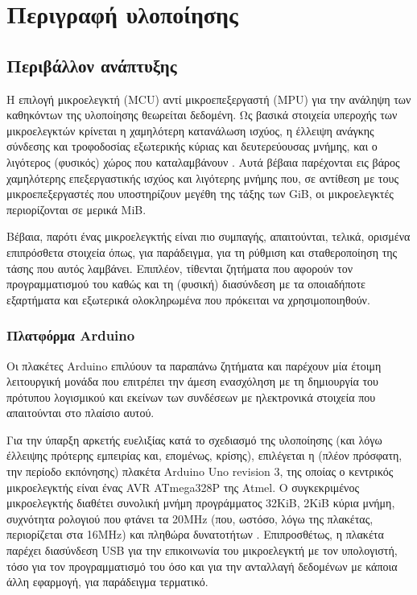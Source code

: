 \chapter{Περιγραφή υλοποίησης}


\section{Περιβάλλον ανάπτυξης}

Η επιλογή μικροελεγκτή (MCU) αντί μικροεπεξεργαστή (MPU) για την ανάληψη των
καθηκόντων της υλοποίησης θεωρείται δεδομένη.
Ως βασικά στοιχεία υπεροχής των μικροελεγκτών κρίνεται η χαμηλότερη κατανάλωση
ισχύος, η έλλειψη ανάγκης σύνδεσης και τροφοδοσίας εξωτερικής κύριας και
δευτερεύουσας μνήμης, και ο λιγότερος (φυσικός) χώρος που καταλαμβάνουν
\parencite[1--2]{atmel13:mpu-mcu}. Αυτά βέβαια παρέχονται εις βάρος χαμηλότερης
επεξεργαστικής ισχύος και λιγότερης μνήμης που, σε αντίθεση με τους
μικροεπεξεργαστές που υποστηρίζουν μεγέθη της τάξης των GiB, οι μικροελεγκτές
περιορίζονται σε μερικά MiB.

Βέβαια, παρότι ένας μικροελεγκτής είναι πιο συμπαγής, απαιτούνται, τελικά,
ορισμένα επιπρόσθετα στοιχεία όπως, για παράδειγμα, για τη ρύθμιση και
σταθεροποίηση της τάσης που αυτός λαμβάνει. Επιπλέον, τίθενται ζητήματα που
αφορούν τον προγραμματισμού του καθώς και τη (φυσική) διασύνδεση με τα
οποιαδήποτε εξαρτήματα και εξωτερικά ολοκληρωμένα που πρόκειται να
χρησιμοποιηθούν.


\subsection{Πλατφόρμα Arduino}
\label{subsec:arduino}

Οι πλακέτες Arduino επιλύουν τα παραπάνω ζητήματα και παρέχουν μία έτοιμη
λειτουργική μονάδα που επιτρέπει την άμεση ενασχόληση με τη δημιουργία του
πρότυπου λογισμικού και εκείνων των συνδέσεων με ηλεκτρονικά στοιχεία που
απαιτούνται στο πλαίσιο αυτού.

Για την ύπαρξη αρκετής ευελιξίας κατά το σχεδιασμό της υλοποίησης (και λόγω
έλλειψης πρότερης εμπειρίας και, επομένως, κρίσης), επιλέγεται η (πλέον
πρόσφατη, την περίοδο εκπόνησης) πλακέτα Arduino Uno revision 3, της οποίας ο
κεντρικός μικροελεγκτής είναι ένας AVR ATmega328P της Atmel. Ο συγκεκριμένος
μικροελεγκτής διαθέτει συνολική μνήμη προγράμματος 32KiB, 2KiB κύρια μνήμη,
συχνότητα ρολογιού που φτάνει τα 20MHz (που, ωστόσο, λόγω της πλακέτας,
περιορίζεται στα 16MHz) και πληθώρα δυνατοτήτων
\parencites[1]{atmel13}{arduino:uno}. Επιπροσθέτως, η πλακέτα παρέχει διασύνδεση
USB για την επικοινωνία του μικροελεγκτή με τον υπολογιστή, τόσο για τον
προγραμματισμό του όσο και για την ανταλλαγή δεδομένων με κάποια άλλη εφαρμογή,
για παράδειγμα τερματικό.

